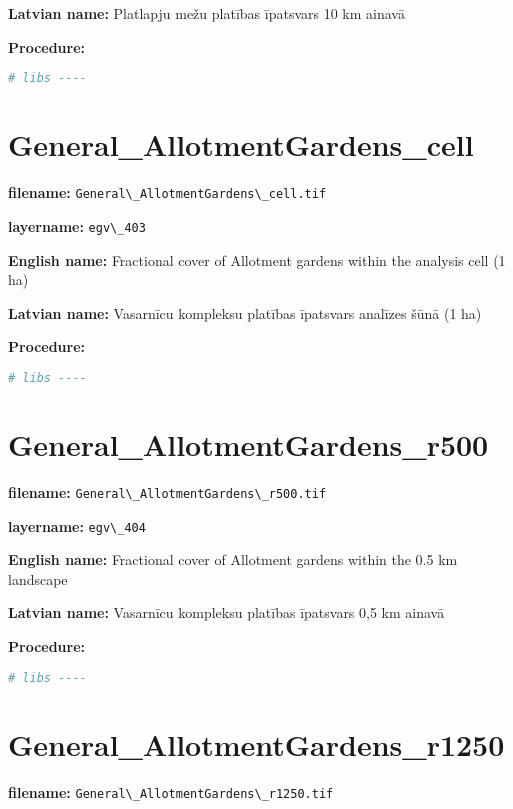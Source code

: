 \documentclass[
]{book}
\newcommand{\passthrough}[1]{#1}
\begin{document}
\textbf{Latvian name:} Platlapju mežu platības īpatsvars 10 km ainavā

\textbf{Procedure:}

\begin{lstlisting}[language=R]
# libs ----
\end{lstlisting}

\section{General\_AllotmentGardens\_cell}\label{ch06.403}

\textbf{filename:} \passthrough{\lstinline!General\_AllotmentGardens\_cell.tif!}

\textbf{layername:} \passthrough{\lstinline!egv\_403!}

\textbf{English name:} Fractional cover of Allotment gardens within the analysis cell (1 ha)

\textbf{Latvian name:} Vasarnīcu kompleksu platības īpatsvars analīzes šūnā (1 ha)

\textbf{Procedure:}

\begin{lstlisting}[language=R]
# libs ----
\end{lstlisting}

\section{General\_AllotmentGardens\_r500}\label{ch06.404}

\textbf{filename:} \passthrough{\lstinline!General\_AllotmentGardens\_r500.tif!}

\textbf{layername:} \passthrough{\lstinline!egv\_404!}

\textbf{English name:} Fractional cover of Allotment gardens within the 0.5 km landscape

\textbf{Latvian name:} Vasarnīcu kompleksu platības īpatsvars 0,5 km ainavā

\textbf{Procedure:}

\begin{lstlisting}[language=R]
# libs ----
\end{lstlisting}

\section{General\_AllotmentGardens\_r1250}\label{ch06.405}

\textbf{filename:} \passthrough{\lstinline!General\_AllotmentGardens\_r1250.tif!}
\end{document}
